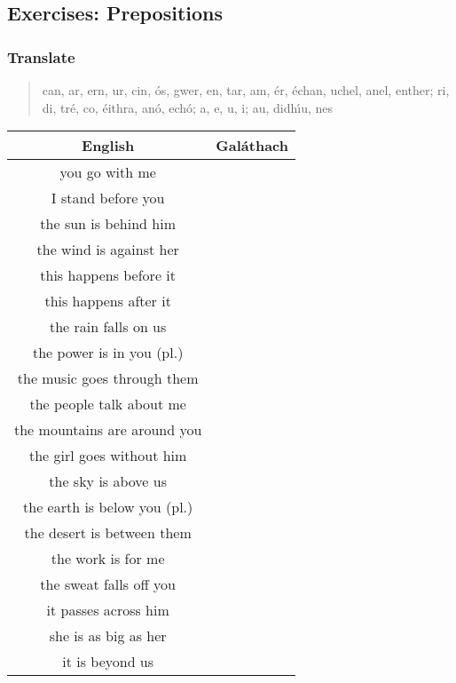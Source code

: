 \newpage
\subsection{Exercises: Prepositions}

\subsubsection{Translate}

\begin{quote}
can, ar, ern, ur, cin, \'{o}s, gwer, en, tar, am, \'{e}r, \'{e}chan, uchel, anel, enther; ri, di, tr\'{e}, co, \'{e}ithra, an\'{o}, ech\'{o}; a, e, u, i; au, didh\'{\i}u, nes
\end{quote}

\begin{table}[H]
\centering
\begin{tabular}{|c|M{5.0cm}|}
  \toprule
  \textbf{English} & \textbf{Gal\'{a}thach}\\
  \toprule
  you go with me & \\
  \midrule
  I stand before you & \\
  \midrule
  the sun is behind him & \\
  \midrule
  the wind is against her & \\
  \midrule
  this happens before it & \\
  \midrule
  this happens after it & \\
  \midrule
  the rain falls on us & \\
  \midrule
  the power is in you (pl.) & \\
  \midrule
  the music goes through them & \\
  \midrule
  the people talk about me & \\
  \midrule
  the mountains are around you & \\
  \midrule
  the girl goes without him & \\
  \midrule
  the sky is above us & \\
  \midrule
  the earth is below you (pl.) & \\
  \midrule
  the desert is between them & \\
  \midrule
  the work is for me & \\
  \midrule
  the sweat falls off you & \\
  \midrule
  it passes across him & \\
  \midrule
  she is as big as her & \\
  \midrule
  it is beyond us & \\

\end{tabular}
\end{table}
